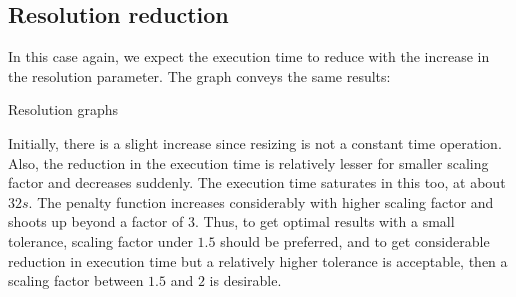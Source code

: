 \documentclass{article}
\begin{document}
\subsection{Resolution reduction}
In this case again, we expect the execution time to reduce with the increase in the resolution parameter. The graph conveys the same results:
\begin{center}
    Resolution graphs
\end{center}
Initially, there is a slight increase since resizing is not a constant time operation. Also, the reduction in the execution time is relatively lesser for smaller scaling factor and decreases suddenly. The execution time saturates in this too, at about $32s$. The penalty function increases considerably with higher scaling factor and shoots up beyond a factor of $3$. Thus, to get optimal results with a small tolerance, scaling factor under $1.5$ should be preferred, and to get considerable reduction in execution time but a relatively higher tolerance is acceptable, then a scaling factor between $1.5$ and $2$ is desirable.
\end{document}
